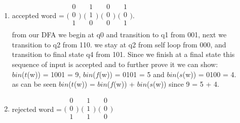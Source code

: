 \documentclass{article}
\begin{document}
\begin{enumerate}[1.]
    \item accepted word =
    $\bigl(\begin{smallmatrix}0\\0\\1\\ \end{smallmatrix}\bigr)$
    $\bigl(\begin{smallmatrix}1\\1\\0\\ \end{smallmatrix}\bigr)$
    $\bigl(\begin{smallmatrix}0\\0\\0\\ \end{smallmatrix}\bigr)$
    $\bigl(\begin{smallmatrix}1\\0\\1\\ \end{smallmatrix}\bigr)$.\\
    from our DFA we begin at q0 and transition to q1 from 001, next we transition to q2 from 110. we stay at q2 from self loop from 000, and transition to final state q4 from 101. Since we finish at a final state this sequence of input is accepted and to further prove it we can show:\\
    $bin$($t$(w)) = 1001 = 9, 
    $bin$($f$(w)) = 0101 = 5 and
    $bin$($s$(w)) = 0100 = 4.\\
    as can be seen $bin$($t$(w)) = $bin$($f$(w)) + $bin$($s$(w)) since 9 = 5 + 4.\\
    \item rejected word =     $\bigl(\begin{smallmatrix}0\\0\\1\\ \end{smallmatrix}\bigr)$
    $\bigl(\begin{smallmatrix}1\\1\\1\\ \end{smallmatrix}\bigr)$
    $\bigl(\begin{smallmatrix}0\\0\\0\\ \end{smallmatrix}\bigr)$

\end{enumerate}
\end{document}
